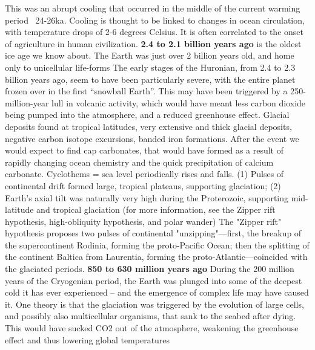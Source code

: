     			This was an abrupt cooling that occurred in the middle of the current warming period ~24-26ka. Cooling is thought to be linked to changes in ocean circulation, with temperature drops of 2-6 degrees Celsius. It is often correlated to the onset of agriculture in human civilization.
    			\textbf{2.4 to 2.1 billion years ago} \ddd
    			 is the oldest ice age we know about. The Earth was just over 2 billion years old, and home only to unicellular life-forms
    			The early stages of the Huronian, from 2.4 to 2.3 billion years ago, seem to have been particularly severe, with the entire planet frozen over in the first “snowball Earth”. This may have been triggered by a 250-million-year lull in volcanic activity, which would have meant less carbon dioxide being pumped into the atmosphere, and a reduced greenhouse effect.
    			\ddd Glacial deposits found at tropical latitudes, very extensive and thick glacial deposits, negative carbon isotope excursions, banded iron formations. After the event we would expect to find cap carbonates, that would have formed as a result of rapidly changing ocean chemistry and the quick precipitation of calcium carbonate. Cyclothems = sea level periodically rises and falls.
    			(1) Pulses of continental drift formed large, tropical plateaus, supporting glaciation; (2) Earth’s axial tilt was naturally very high during the Proterozoic, supporting mid-latitude and tropical glaciation (for more information, see the Zipper rift hypothesis, high-obliquity hypothesis, and polar wander)
    			The "Zipper rift" hypothesis proposes two pulses of continental "unzipping"—first, the breakup of the supercontinent Rodinia, forming the proto-Pacific Ocean; then the splitting of the continent Baltica from Laurentia, forming the proto-Atlantic—coincided with the glaciated periods.
    			\textbf{850 to 630 million years ago}
    			\ddd During the 200 million years of the Cryogenian period, the Earth was plunged into some of the deepest cold it has ever experienced – and the emergence of complex life may have caused it.
    			\ddd One theory is that the glaciation was triggered by the evolution of large cells, and possibly also multicellular organisms, that sank to the seabed after dying. This would have sucked CO2 out of the atmosphere, weakening the greenhouse effect and thus lowering global temperatures
